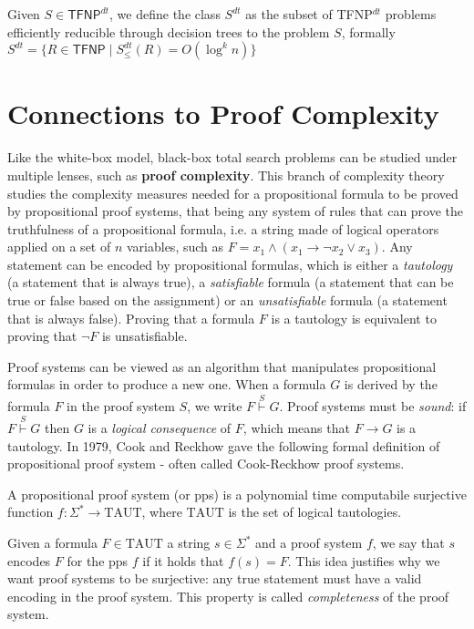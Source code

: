 \begin{definition}
    Given $S \in \mathsf{TFNP}^{dt}$, we define the class $S^{dt}$ as the subset of \textsf{TFNP}$^{dt}$ problems efficiently reducible through decision trees to the problem $S$, formally $S^{dt} = \{R \in \mathsf{TFNP} \mid S^{dt}_\leq(R) = O(\log^k n)\}$
\end{definition}

\section{Connections to Proof Complexity}

Like the white-box model, black-box total search problems can be studied under multiple lenses, such as \textbf{proof complexity}. This branch of complexity theory studies the complexity measures needed for a propositional formula to be proved by propositional proof systems, that being any system of rules that can prove the truthfulness of a propositional formula, i.e. a string made of logical operators applied on a set of $n$ variables, such as $F = x_1 \land (x_1 \to \lnot x_2 \lor x_3)$. Any statement can be encoded by propositional formulas, which is either a \textit{tautology} (a statement that is always true), a \textit{satisfiable} formula (a statement that can be true or false based on the assignment) or an \textit{unsatisfiable} formula (a statement that is always false). Proving that a formula $F$ is a tautology is equivalent to proving that $\lnot F$ is unsatisfiable.

Proof systems can be viewed as an algorithm that manipulates propositional formulas in order to produce a new one. When a formula $G$ is derived by the formula $F$ in the proof system $S$, we write $F \stackrel{S}{\vdash} G$. Proof systems must be \textit{sound}: if $F \stackrel{S}{\vdash} G$ then $G$ is a \textit{logical consequence} of $F$, which means that $F \to G$ is a tautology. In 1979, Cook and Reckhow gave the following formal definition of propositional proof system - often called Cook-Reckhow proof systems.

\begin{definition}
    A propositional proof system (or pps) is a polynomial time computabile surjective function $f : \Sigma^* \to \mathrm{TAUT}$, where $\mathrm{TAUT}$ is the set of logical tautologies.
\end{definition}

Given a formula $F \in \mathrm{TAUT}$ a string $s \in \Sigma^*$ and a proof system $f$, we say that $s$ encodes $F$ for the pps $f$ if it holds that $f(s) = F$. This idea justifies why we want proof systems to be surjective: any true statement must have a valid encoding in the proof system. This property is called \textit{completeness} of the proof system.

